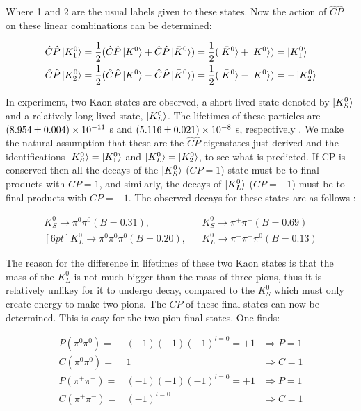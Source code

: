 \noindent Where 1 and 2 are the usual labels given to these states. Now the action of $\hat{C}\hat{P}$ on these linear combinations can be determined:

\smallskip

\begin{align*}
\hat{C}\hat{P} \ket{K^{0}_{1}} & = \frac{1}{2} (\hat{C}\hat{P} \ket{K^{0}} + \hat{C}\hat{P} \ket{\bar{K}^{0}}) = \frac{1}{2} (\ket{\bar{K}^{0}} + \ket{K^{0}}) = \ket{K^{0}_{1}} \\
\hat{C}\hat{P} \ket{K^{0}_{2}} & = \frac{1}{2} (\hat{C}\hat{P} \ket{K^{0}} - \hat{C}\hat{P} \ket{\bar{K}^{0}}) =   \frac{1}{2} (\ket{\bar{K}^{0}} - \ket{K^{0}}) = - \ket{K^{0}_{2}} \\
\end{align*} 

In experiment, two Kaon states are observed, a short lived state denoted by $\ket{K^{0}_{S}}$ and a relatively long lived state, $\ket{K^{0}_{L}}$. The lifetimes of these particles are $(8.954 \pm 0.004) \times 10^{-11}$ s and $(5.116 \pm 0.021) \times 10^{-8}$ s, respectively \cite{PDGKaons}. We make the natural assumption that these are the $\hat{C}\hat{P}$ eigenstates just derived and the identifications $\ket{K^{0}_{S}} = \ket{K^{0}_{1}}$ and $\ket{K^{0}_{L}} = \ket{K^{0}_{2}}$, to see what is predicted. If CP is conserved then all the decays of the $\ket{K^{0}_{S}}$ ($CP = 1$) state must be to final products with $CP = 1$, and similarly, the decays of $\ket{K^{0}_{L}}$ ($CP = -1$) must be to final products with $CP = -1$. The observed decays for these states are as follows \cite[pg. 292]{Martin+Shaw}:

\begin{eqnarray*}    
K^{0}_S \rightarrow \pi^0 \pi^0 (B = 0.31),  &   &   K^{0}_{S} \rightarrow \pi^{+} \pi^{-} (B = 0.69)\\ [6pt]
K^{0}_L \rightarrow \pi^0 \pi^0 \pi^0 (B = 0.20),   &   &   K^{0}_{L} \rightarrow \pi^{+}  \pi^{-} \pi^0 (B =0.13)  
\end{eqnarray*}    

\noindent The reason for the difference in lifetimes of these two Kaon states is that the mass of the $K^{0}_L$ is not much bigger than the mass of three pions, thus it is relatively unlikey for it to undergo decay, compared to the $K^{0}_S$ which must only create energy to make two pions. The $CP$ of these final states can now be determined. This is easy for the two pion final states. One finds:

\begin{align}
{P} ({\pi^0 \pi^0})   = & (-1)(-1)(-1)^{l=0} = +1 & \Rightarrow P = 1  \\
{C} ({\pi^0 \pi^0})   = & 1                       & \Rightarrow C = 1  \\
{P} ({\pi^+ \pi^-})   = & (-1)(-1)(-1)^{l=0} = +1 & \Rightarrow P = 1  \\
\label{TwoPionFinalStateCalc}
{C} ({\pi^+ \pi^-})   = & (-1)^{l=0}             & \Rightarrow C = 1 
\end{align}

